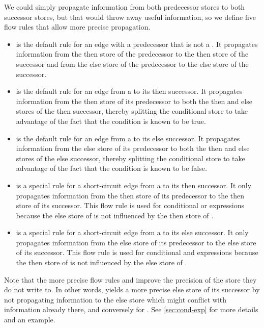 We could simply propagate information from both predecessor stores to
both successor stores, but that would throw away useful information,
so we define five flow rules that allow more precise propagation.

\begin{itemize}
    \item {} is the default rule for an edge with a
      predecessor that is not a .  It
      propagates information from the then store of the predecessor to
      the then store of the successor and from the else store of the
      predecessor to the else store of the successor.
    \item {} is the default rule for an edge from a
       to its then successor.  It propagates
      information from the then store of its predecessor to both the
      then and else stores of the then successor, thereby splitting
      the conditional store to take advantage of the fact that the
      condition is known to be true.
    \item {} is the default rule for an edge from a
       to its else successor.  It propagates
      information from the else store of its predecessor to both the
      then and else stores of the else successor, thereby splitting
      the conditional store to take advantage of the fact that the
      condition is known to be false.
    \item {} is a special rule for a short-circuit edge
      from a  to its then successor.  It only
      propagates information from the then store of its predecessor to
      the then store of its successor.  This flow rule is used for
      conditional or expressions because the else store of  is not influenced by the then store of .
    \item {} is a special rule for a short-circuit edge
      from a  to its else successor.  It only
      propagates information from the else store of its predecessor to
      the else store of its successor.  This flow rule is used for
      conditional and expressions because the then store of  is not influenced by the else store of .
\end{itemize}

Note that the more precise flow rules  and
 improve the precision of the store they do not
write to.  In other words,  yields a more precise
else store of its successor by not propagating information to the else
store which might conflict with information already there, and
conversely for .
See \autoref{sec:cond-exp} for more details and an example.

